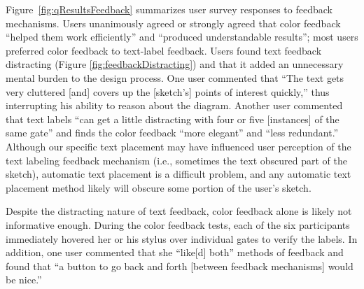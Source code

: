 \documentclass{elsart}
\begin{document}


Figure~\ref{fig:qResultsFeedback} summarizes user survey responses
to feedback mechanisms.  Users unanimously agreed or strongly agreed
that color feedback ``helped them work efficiently'' and ``produced
understandable results''; most users preferred color feedback to
text-label feedback.  Users found text feedback distracting (Figure
\ref{fig:feedbackDistracting}) and that it added an unnecessary mental
burden to the design process.  One user commented that ``The text gets
very cluttered [and] covers up the [sketch's] points of interest
quickly,'' thus interrupting his ability to reason about the diagram.
Another user commented that text labels ``can get a little distracting
with four or five [instances] of the same gate'' and finds the color
feedback ``more elegant'' and ``less redundant.''  Although our
specific text placement may have influenced user perception of the
text labeling feedback mechanism (i.e., sometimes the text obscured
part of the sketch), automatic text placement is a difficult problem,
and any automatic text placement method likely will obscure some
portion of the user's sketch.


Despite the distracting nature of text feedback, color feedback alone
is likely not informative enough.  During the color feedback tests,
each of the six participants immediately hovered her or his stylus
over individual gates to verify the labels.  In
addition, one user commented that she ``like[d] both'' methods of
feedback and found that ``a button to go back and forth [between
feedback mechanisms] would be nice.''
\end{document}
